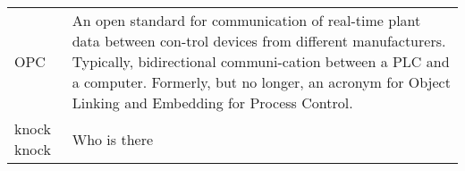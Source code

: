 
\clearpage


\pagestyle{fancy}
\fancyhead{} %

\begin{tabular}{p{3cm}  p{10cm}}

\small OPC              & \small An open standard for communication of real-time plant data between con-trol devices from                                       different manufacturers. Typically, bidirectional communi-cation between a PLC and a computer.                                   Formerly, but no longer, an acronym for Object Linking and Embedding for Process Control.\\

\small knock knock      & \small Who is there \\

\end{tabular}